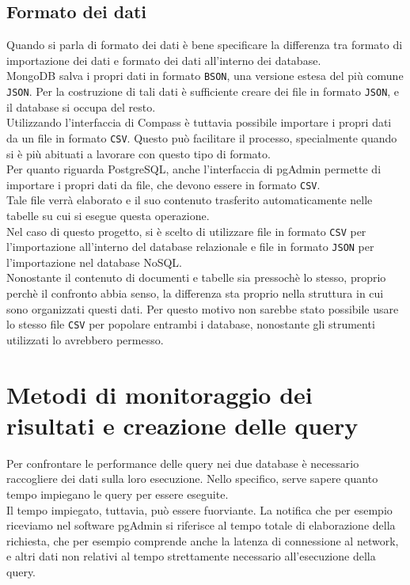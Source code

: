 \subsection{Formato dei dati}
Quando si parla di formato dei dati è bene specificare la differenza tra formato di importazione dei dati e formato dei dati all'interno dei database.\\
MongoDB salva i propri dati in formato \texttt{BSON}, una versione estesa del più comune \texttt{JSON}. Per la costruzione di tali dati è sufficiente creare dei file in formato \texttt{JSON}, e il database si occupa del resto.\\
Utilizzando l'interfaccia di Compass è tuttavia possibile importare i propri dati da un file in formato \texttt{CSV}. Questo può facilitare il processo, specialmente quando si è più abituati a lavorare con questo tipo di formato.\\
Per quanto riguarda PostgreSQL, anche l'interfaccia di pgAdmin permette di importare i propri dati da file, che devono essere in formato \texttt{CSV}.\\
Tale file verrà elaborato e il suo contenuto trasferito automaticamente nelle tabelle su cui si esegue questa operazione.\\

\noindent Nel caso di questo progetto, si è scelto di utilizzare file in formato \texttt{CSV} per l'importazione all'interno del database relazionale e file in formato \texttt{JSON} per l'importazione nel database NoSQL.\\
Nonostante il contenuto di documenti e tabelle sia pressochè lo stesso, proprio perchè il confronto abbia senso, la differenza sta proprio nella struttura in cui sono organizzati questi dati. Per questo motivo non sarebbe stato possibile usare lo stesso file \texttt{CSV} per popolare entrambi i database, nonostante gli strumenti utilizzati lo avrebbero permesso.\\

\section{Metodi di monitoraggio dei risultati e creazione delle query}
Per confrontare le performance delle query nei due database è necessario raccogliere dei dati sulla loro esecuzione. Nello specifico, serve sapere quanto tempo impiegano le query per essere eseguite.\\
Il tempo impiegato, tuttavia, può essere fuorviante. La notifica che per esempio riceviamo nel software pgAdmin si riferisce al tempo totale di elaborazione della richiesta, che per esempio comprende anche la latenza di connessione al network, e altri dati non relativi al tempo strettamente necessario all'esecuzione della query.\\


